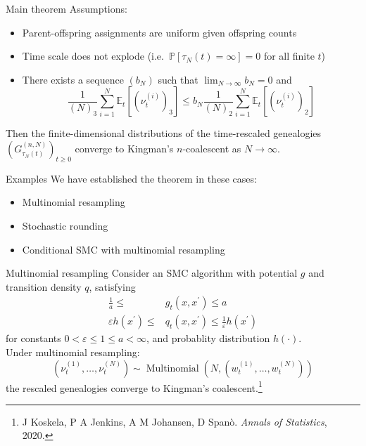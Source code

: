\documentclass[aspectratio=169]{beamer}
\theoremstyle{definition}
\newcommand{\PR}{\mathbb{P}}
\newcommand{\E}{\mathbb{E}}
\newcommand{\Mn}{\operatorname{Multinomial}}
\newcommand{\vt}[2][t]{\nu_{#1}^{(#2)}}
\newcommand{\wt}[2][t]{w_{#1}^{(#2)}}
\begin{document}
\begin{frame}{Main theorem}
Assumptions:
\begin{itemize}
\item Parent-offspring assignments are uniform given offspring counts
\pause
\item Time scale does not explode (i.e.\ $\PR[\tau_N(t)=\infty]=0$ for all finite $t$)
\pause
\item There exists a sequence $(b_N)$ such that $\lim_{N\to\infty} b_N = 0$ and
\begin{equation*}
\frac{1}{(N)_3} \sum_{i=1}^N \E_t [ (\vt{i})_3 ]
\leq b_N \frac{1}{(N)_2} \sum_{i=1}^N \E_t [ (\vt{i})_2 ]
\end{equation*}
\end{itemize}
\pause
Then the finite-dimensional distributions of the time-rescaled genealogies $\left( G_{\tau_N(t)}^{(n,N)} \right)_{t\geq0}$ converge to Kingman's $n$-coalescent as $N\to\infty$.
\end{frame}


\begin{frame}{Examples}
We have established the theorem in these cases:
\begin{itemize}
\item Multinomial resampling
\item Stochastic rounding 
\item Conditional SMC with multinomial resampling
\end{itemize}
\end{frame}


\begin{frame}{Multinomial resampling}
Consider an SMC algorithm with potential $g$ and transition density $q$, satisfying
\begin{align*}
\frac{1}{a} \leq &g_t(x, x^\prime) \leq a \\
\varepsilon h(x^\prime) \leq &q_t(x, x^\prime) \leq \frac{1}{\varepsilon} h(x^\prime) 
\end{align*}
for constants $0<\varepsilon\leq 1\leq a<\infty$, and probablity distribution $h(\cdot)$.\\[10pt]
\pause
Under multinomial resampling:
\begin{equation*}
(\vt{1} , \dots, \vt{N}) \sim \Mn \left( N, (\wt{1},\dots,\wt{N}) \right)
\end{equation*}
the rescaled genealogies converge to Kingman's coalescent.\footnote{J Koskela, P A Jenkins, A M Johansen, D Span\`o. \textit{Annals of Statistics}, 2020.}
\end{frame}
\end{document}
